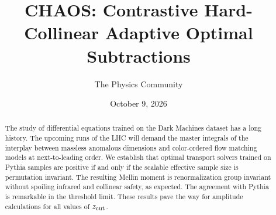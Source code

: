\documentclass[11pt]{article}
\title{CHAOS: Contrastive Hard-Collinear Adaptive Optimal Subtractions}
\author{The Physics Community}
\date{October 9, 2026}
\begin{document}
\maketitle
\begin{abstract}
The study of differential equations trained on the Dark Machines dataset
has a long history. The upcoming runs of the LHC will demand the master
integrals of the interplay between massless anomalous dimensions and
color-ordered flow matching models at next-to-leading order. We
establish that optimal transport solvers trained on Pythia samples are
positive if and only if the scalable effective sample size is
permutation invariant. The resulting Mellin moment is renormalization
group invariant without spoiling infrared and collinear safety, as
expected. The agreement with Pythia is remarkable in the threshold
limit. These results pave the way for amplitude calculations for all
values of $z_{\rm cut}$.
\end{abstract}
\tableofcontents




\nocite{*}


\end{document}
